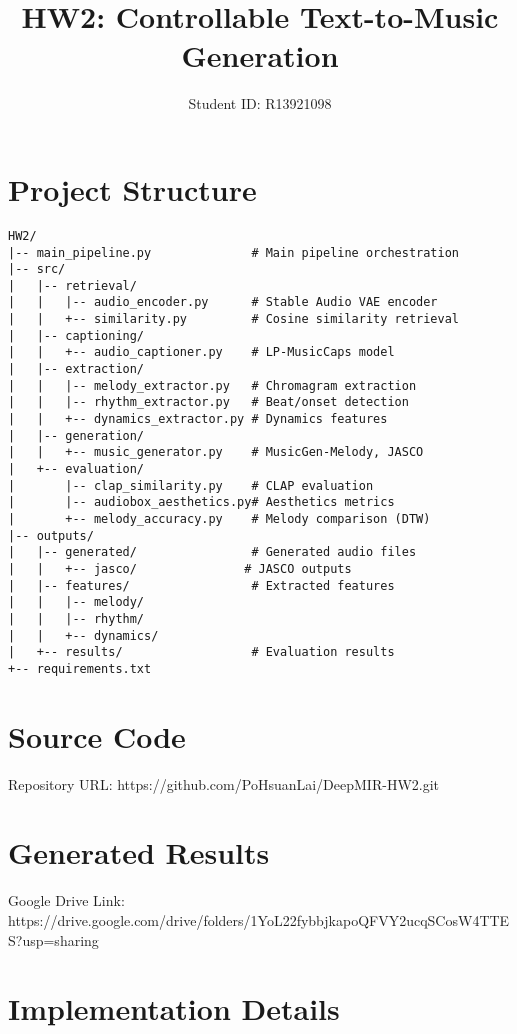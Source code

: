 \documentclass{article}
\title{HW2: Controllable Text-to-Music Generation}
\author{Student ID: R13921098}
\date{}
\begin{document}
\begin{CJK}{UTF8}{bsmi}

\maketitle

\section{Project Structure}

\begin{verbatim}
HW2/
|-- main_pipeline.py              # Main pipeline orchestration
|-- src/
|   |-- retrieval/
|   |   |-- audio_encoder.py      # Stable Audio VAE encoder
|   |   +-- similarity.py         # Cosine similarity retrieval
|   |-- captioning/
|   |   +-- audio_captioner.py    # LP-MusicCaps model
|   |-- extraction/
|   |   |-- melody_extractor.py   # Chromagram extraction
|   |   |-- rhythm_extractor.py   # Beat/onset detection
|   |   +-- dynamics_extractor.py # Dynamics features
|   |-- generation/
|   |   +-- music_generator.py    # MusicGen-Melody, JASCO
|   +-- evaluation/
|       |-- clap_similarity.py    # CLAP evaluation
|       |-- audiobox_aesthetics.py# Aesthetics metrics
|       +-- melody_accuracy.py    # Melody comparison (DTW)
|-- outputs/
|   |-- generated/                # Generated audio files
|   |   +-- jasco/               # JASCO outputs
|   |-- features/                 # Extracted features
|   |   |-- melody/
|   |   |-- rhythm/
|   |   +-- dynamics/
|   +-- results/                  # Evaluation results
+-- requirements.txt
\end{verbatim}

\section{Source Code}

Repository URL: https://github.com/PoHsuanLai/DeepMIR-HW2.git

\section{Generated Results}

Google Drive Link: https://drive.google.com/drive/folders/1YoL22fybbjkapoQFVY2ucqSCosW4TTES?usp=sharing

\section{Implementation Details}


\end{CJK}
\end{document}
